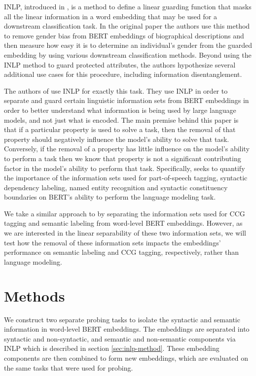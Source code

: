 \documentclass[11pt,a4paper]{article}
\begin{document}
INLP, introduced in \citealp{inlp}, is a method to define a linear guarding function that masks all the linear information in a word embedding that may be used for a downstream classification task. In the original paper the authors use this method to remove gender bias from BERT embeddings of biographical descriptions and then measure how easy it is to determine an individual's gender from the guarded embedding by using various downstream classification methods. Beyond using the INLP method to guard protected attributes, the authors hypothesize several additional use cases for this procedure, including information disentanglement. 

The authors of \citealp{amnesia} use INLP for exactly this task. They use INLP in order to separate and guard certain linguistic information sets from BERT embeddings in order to better understand what information is being used by large language models, and not just what is encoded. The main premise behind this paper is that if a particular property is used to solve a task, then the removal of that property should negatively influence the model's ability to solve that task. Conversely, if the removal of a property has little influence on the model's ability to perform a task then we know that property is not a significant contributing factor in the model's ability to perform that task. Specifically, \citealp{amnesia} seeks to quantify the importance of the information sets used for part-of-speech tagging, syntactic dependency labeling, named entity recognition and syntactic constituency boundaries on BERT's ability to perform the language modeling task. 

We take a similar approach to \citealp{amnesia} by separating the information sets used for CCG tagging and semantic labeling from word-level BERT embeddings. However, as we are interested in the linear separability of these two information sets, we will test how the removal of these information sets impacts the embeddings' performance on semantic labeling and CCG tagging, respectively, rather than language modeling. 



\section{Methods}
\label{sec:method}


We construct two separate probing tasks to isolate the syntactic and semantic information in word-level BERT embeddings. The embeddings are separated into syntactic and non-syntactic, and semantic and non-semantic components via INLP which is described in section \ref{sec:inlp-method}. These embedding components are then combined to form new embeddings, which are evaluated on the same tasks that were used for probing. %
\end{document}
